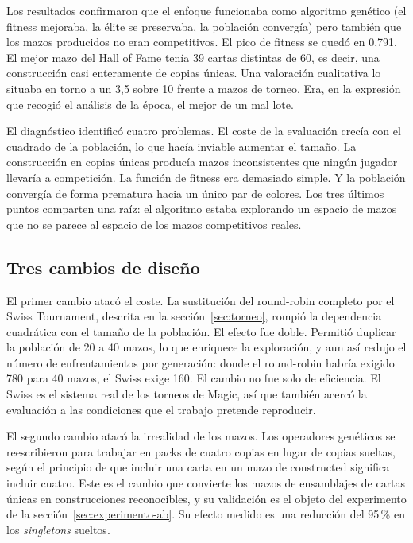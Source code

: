 Los resultados confirmaron que el enfoque funcionaba como algoritmo genético (el fitness mejoraba, la élite se preservaba, la población convergía) pero también que los mazos producidos no eran competitivos. El pico de fitness se quedó en 0,791. El mejor mazo del Hall of Fame tenía 39 cartas distintas de 60, es decir, una construcción casi enteramente de copias únicas. Una valoración cualitativa lo situaba en torno a un 3,5 sobre 10 frente a mazos de torneo. Era, en la expresión que recogió el análisis de la época, el mejor de un mal lote.

El diagnóstico identificó cuatro problemas. El coste de la evaluación crecía con el cuadrado de la población, lo que hacía inviable aumentar el tamaño. La construcción en copias únicas producía mazos inconsistentes que ningún jugador llevaría a competición. La función de fitness era demasiado simple. Y la población convergía de forma prematura hacia un único par de colores. Los tres últimos puntos comparten una raíz: el algoritmo estaba explorando un espacio de mazos que no se parece al espacio de los mazos competitivos reales.

\subsection{Tres cambios de diseño}

El primer cambio atacó el coste. La sustitución del round-robin completo por el Swiss Tournament, descrita en la sección~\ref{sec:torneo}, rompió la dependencia cuadrática con el tamaño de la población. El efecto fue doble. Permitió duplicar la población de 20 a 40 mazos, lo que enriquece la exploración, y aun así redujo el número de enfrentamientos por generación: donde el round-robin habría exigido 780 para 40 mazos, el Swiss exige 160. El cambio no fue solo de eficiencia. El Swiss es el sistema real de los torneos de Magic, así que también acercó la evaluación a las condiciones que el trabajo pretende reproducir.

El segundo cambio atacó la irrealidad de los mazos. Los operadores genéticos se reescribieron para trabajar en packs de cuatro copias en lugar de copias sueltas, según el principio de que incluir una carta en un mazo de constructed significa incluir cuatro. Este es el cambio que convierte los mazos de ensamblajes de cartas únicas en construcciones reconocibles, y su validación es el objeto del experimento de la sección~\ref{sec:experimento-ab}. Su efecto medido es una reducción del 95\,\% en los \emph{singletons} sueltos.

